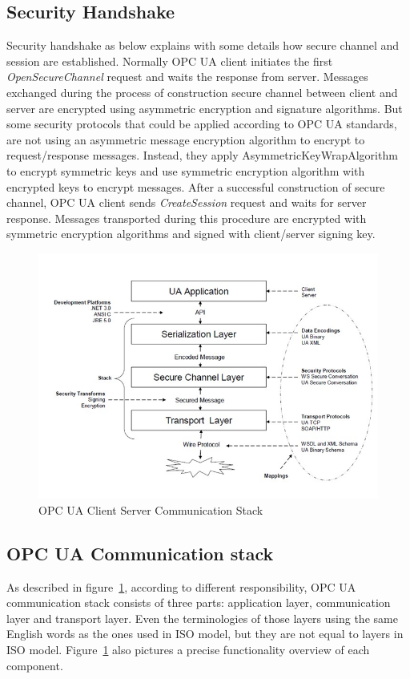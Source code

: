 \subsection{Security Handshake}
Security handshake as below explains with some details how secure channel and session are established. Normally OPC UA client initiates the first \emph{OpenSecureChannel} request and waits the response from server. Messages exchanged during the process of construction secure channel between client and server are encrypted using asymmetric encryption and signature algorithms. But some security protocols that could be applied according to OPC UA standards, are not using an asymmetric message encryption algorithm to encrypt to request/response messages. Instead, they apply AsymmetricKeyWrapAlgorithm to encrypt symmetric keys and use symmetric encryption algorithm with encrypted keys to encrypt messages. After a successful construction of secure channel, OPC UA client sends \emph{CreateSession} request and waits for server response. Messages transported during this procedure are encrypted with symmetric encryption algorithms and signed with client/server signing key.
\begin{figure}[!htbp]
	\centering
	\includegraphics[width=1\textwidth]{opc_ua_commstack.jpg}
		\caption{OPC UA Client Server Communication Stack\cite{O2}}
	\label{fig:opc_ua_commstack}
\end{figure}

\subsection{OPC UA Communication stack}
As described in figure~\ref{fig:opc_ua_commstack}, according to different responsibility, OPC UA communication stack consists of three parts: application layer, communication layer and transport layer. Even the terminologies of those layers using the same English words as the ones used in ISO model, but they are not equal to layers in ISO model. Figure~\ref{fig:opc_ua_commstack} also pictures a precise functionality overview of each component.

